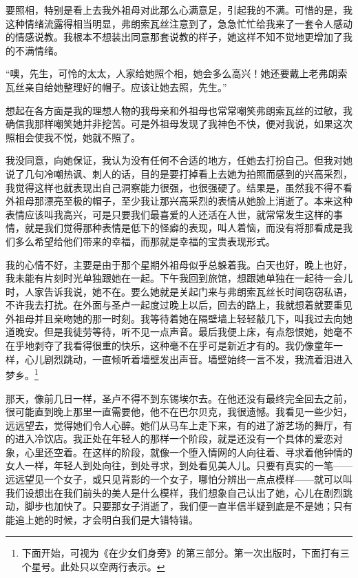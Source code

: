 \par 要照相，特别是看上去我外祖母对此那么心满意足，引起我的不满。可惜的是，我这种情绪流露得相当明显，弗朗索瓦丝注意到了，急急忙忙给我来了一套令人感动的情感说教。我根本不想装出同意那套说教的样子，她这样不知不觉地更增加了我的不满情绪。
\par “噢，先生，可怜的太太，人家给她照个相，她会多么高兴！她还要戴上老弗朗索瓦丝亲自给她整理好的帽子。应该让她去照，先生。”
\par 想起在各方面是我的理想人物的我母亲和外祖母也常常嘲笑弗朗索瓦丝的过敏，我确信我那样嘲笑她并非挖苦。可是外祖母发现了我神色不快，便对我说，如果这次照相会使我不悦，她就不照了。
\par 我没同意，向她保证，我认为没有任何不合适的地方，任她去打扮自己。但我对她说了几句冷嘲热讽、刺人的话，目的是要打掉看上去她为拍照而感到的兴高采烈，我觉得这样也就表现出自己洞察能力很强，也很强硬了。结果是，虽然我不得不看外祖母那漂亮至极的帽子，至少我让那兴高采烈的表情从她脸上消逝了。本来这种表情应该叫我高兴，可是只要我们最喜爱的人还活在人世，就常常发生这样的事情，就是我们觉得那种表情是低下的怪癖的表现，叫人着恼，而没有将那看成是我们多么希望给他们带来的幸福，而那就是幸福的宝贵表现形式。
\par 我的心情不好，主要是由于那个星期外祖母似乎总躲着我。白天也好，晚上也好，我未能有片刻时光单独跟她在一起。下午我回到旅馆，想跟她单独在一起待一会儿时，人家告诉我说，她不在。要么她就是关起门来与弗朗索瓦丝长时间窃窃私语，不许我去打扰。在外面与圣卢一起度过晚上以后，回去的路上，我就想着就要重见外祖母并且亲吻她的那一时刻。我等待着她在隔壁墙上轻轻敲几下，叫我过去向她道晚安。但是我徒劳等待，听不见一点声音。最后我便上床，有点怨恨她，她毫不在乎地剥夺了我看得很重的快乐，这种毫不在乎可是新近才有的。我仍像童年一样，心儿剧烈跳动，一直倾听着墙壁发出声音。墙壁始终一言不发，我流着泪进入梦乡。\footnote{下面开始，可视为《在少女们身旁》的第三部分。第一次出版时，下面打有三个星号。此处只以空两行表示。}
\par 那天，像前几日一样，圣卢不得不到东锡埃尔去。在他还没有最终完全回去之前，很可能直到晚上那里一直需要他，他不在巴尔贝克，我很遗憾。我看见一些少妇，远远望去，觉得她们令人心醉。她们从马车上走下来，有的进了游艺场的舞厅，有的进入冷饮店。我正处在年轻人的那样一个阶段，就是还没有一个具体的爱恋对象，心里还空着。在这样的阶段，就像一个堕入情网的人向往着、寻求着他钟情的女人一样，年轻人到处向往，到处寻求，到处看见美人儿。只要有真实的一笔——远远望见一个女子，或只见背影的一个女子，哪怕分辨出一点点模样——就可以叫我们设想出在我们前头的美人是什么模样，我们想象自己认出了她，心儿在剧烈跳动，脚步也加快了。只要那女子消逝了，我们便一直半信半疑到底是不是她；只有能追上她的时候，才会明白我们是大错特错。
